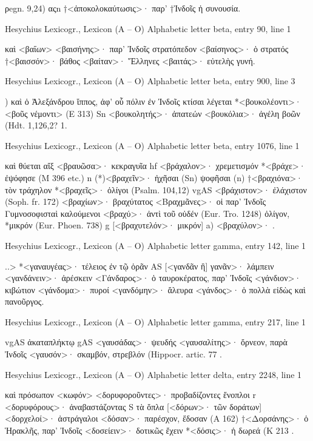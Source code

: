 \documentclass[12pt,letterpaper,twoside,final]{memoir}
\begin{document}
\begin{greek}
                                      ρegn. 9,24) αςn 
†<ἀποκολοκαύτωσις>· παρ' †Ἰνδοῖς ἡ συνουσία. 



Hesychius Lexicogr., Lexicon (Α – Ο) 
Alphabetic letter beta, entry 90, line 1

                                  καὶ <βαΐων> 
<βαισήνης>· παρ' Ἰνδοῖς στρατόπεδον 
<βαίσηνος>· ὁ στρατός 
†<βαισσόν>· βάθος 
<βαίταν>· Ἕλληνες   
<βαιτάς>· εὐτελὴς γυνή. 



Hesychius Lexicogr., Lexicon (Α – Ο) 
Alphabetic letter beta, entry 900, line 3

                     ) καὶ ὁ Ἀλεξάνδρου ἵππος, ἀφ' οὗ πόλιν ἐν 
 Ἰνδοῖς κτίσαι λέγεται 
*<βουκολέοντι>· <βοῦς νέμοντι> (Ε 313) Sn 
<βουκολητής>· ἀπατεών 
<βουκόλια>· ἀγέλη βοῶν (Hdt. 1,126,2? 1. 



Hesychius Lexicogr., Lexicon (Α – Ο) 
Alphabetic letter beta, entry 1076, line 1

καὶ θύεται αἴξ 
<βραυῶσα>· κεκραγυῖα hf 
<βράχαλον>· χρεμετισμόν 
*<βράχε>· ἐψόφησε (Μ 396 etc.) n 
(*)<βραχεῖν>· ἠχῆσαι (Sn) ψοφῆσαι (n) 
†<βραχιόνα>· τὸν τράχηλον 
*<βραχεῖς>· ὀλίγοι (Psalm. 104,12) vgAS 
<βράχιστον>· ἐλάχιστον (Soph. fr. 172) 
<βραχίων>· βραχύτατος 
<Βραχμᾶνες>· οἱ παρ' Ἰνδοῖς Γυμνοσοφισταὶ καλούμενοι 
<βραχύ>· ἀντὶ τοῦ οὐδέν (Eur. Tro. 1248) ὀλίγον, *μικρόν (Eur. 
 Phoen. 738) g 
[<βραχυτελόν>· μικρόν] 
a) <βραχύλον>· . 



Hesychius Lexicogr., Lexicon (Α – Ο) 
Alphabetic letter gamma, entry 142, line 1

                           ..> 
*<γαναυγέας>· τέλειος ἐν τῷ ὁρᾶν AS 
[<γανδᾶν ἢ] γανᾶν>· λάμπειν 
<γανδάνειν>· ἀρέσκειν 
<Γάνδαρος>· ὁ ταυροκέρατος, παρ' Ἰνδοῖς 
<γάνδιον>· κιβώτιον 
<γάνδομα>· πυροί 
<γανδόμην>· ἄλευρα 
<γάνδος>· ὁ πολλὰ εἰδὼς καὶ πανοῦργος. 



Hesychius Lexicogr., Lexicon (Α – Ο) 
Alphabetic letter gamma, entry 217, line 1

                           vgAS ἀκαταπλήκτῳ gAS 
<γαυσάδας>· ψευδής 
<γαυσαλίτης>· ὄρνεον, παρὰ Ἰνδοῖς 
<γαυσόν>· σκαμβόν, στρεβλόν (Hippocr. artic. 77 . 



Hesychius Lexicogr., Lexicon (Α – Ο) 
Alphabetic letter delta, entry 2248, line 1

            καὶ πρόσωπον <κωφόν> 
<δορυφοροῦντες>· προβαδίζοντες ἔνοπλοι r 
<δορυφόρους>· ἀναβαστάζοντας S τὰ ὅπλα 
[<δόρων>· τῶν δοράτων] 
<δορχελοί>· ἀστράγαλοι 
<δόσαν>· παρέσχον, ἔδοσαν (Α 162) 
†<Δορσάνης>· ὁ Ἡρακλῆς, παρ' Ἰνδοῖς 
<δοσείειν>· δοτικῶς ἔχειν 
*<δόσις>· ἡ δωρεά (Κ 213 . 




\end{greek}
\end{document}
